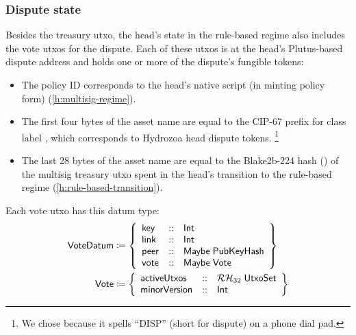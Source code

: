 \documentclass[../hydrozoa.tex]{subfiles}
\begin{document}
\subsubsection{Dispute state}

Besides the treasury utxo, the head's state in the rule-based regime also includes the vote utxos for the dispute.
Each of these utxos is at the head's Plutus-based dispute address and holds one or more of the dispute's fungible tokens:
\begin{itemize}
  \item The policy ID corresponds to the head's native script (in minting policy form) (\cref{h:multisig-regime}).
  \item The first four bytes of the asset name are equal to the CIP-67
    \citep{AlessandroKonradThomasVellekoopCIP67AssetName2022}
    prefix for class label , which corresponds to Hydrozoa head dispute tokens.%
    \footnote{We chose  because it spells ``DISP'' (short for dispute) on a phone dial pad.}
  \item The last 28 bytes of the asset name are equal to the Blake2b-224 hash () of the multisig treasury utxo spent in the head's transition to the rule-based regime (\cref{h:rule-based-transition}).
\end{itemize}

Each vote utxo has this datum type:
\begin{equation*}
\begin{split}
  \mathsf{VoteDatum} &\coloneq \left\{
    \begin{array}{lll}
      \mathsf{key}  &::& \mathsf{Int} \\
      \mathsf{link} &::& \mathsf{Int} \\
      \mathsf{peer} &::& \mathsf{Maybe} \; \mathsf{PubKeyHash} \\
      \mathsf{vote} &::& \mathsf{Maybe} \; \mathsf{Vote}
    \end{array}\right\}\\
  \mathsf{Vote} &\coloneq \left\{
    \begin{array}{lll}
      \mathsf{activeUtxos} &::& \mathcal{RH}_{32} \; \mathsf{UtxoSet} \\
      \mathsf{minorVersion} &::& \mathsf{Int}
    \end{array}\right\}
\end{split}
\end{equation*}
\end{document}
